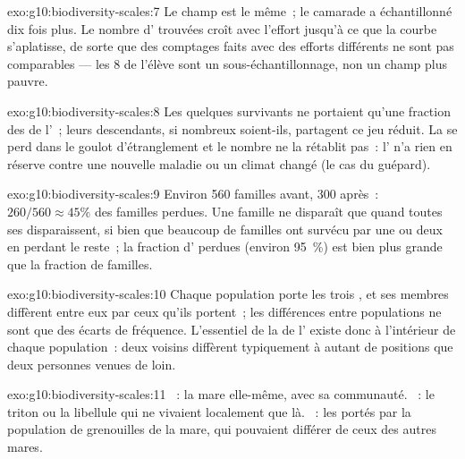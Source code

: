 \begin{solution}{exo:g10:biodiversity-scales:7}
Le champ est le même~; le camarade a échantillonné dix fois plus. Le
nombre d' trouvées croît avec l'effort jusqu'à ce que la courbe
s'aplatisse, de sorte que des comptages faits avec des efforts
différents ne sont pas comparables --- les 8 de l'élève sont un
sous-échantillonnage, non un champ plus pauvre.
\end{solution}

\begin{solution}{exo:g10:biodiversity-scales:8}
Les quelques survivants ne portaient qu'une fraction des  de
l'~; leurs descendants, si nombreux soient-ils, partagent ce jeu
réduit. La  se perd dans le goulot d'étranglement et
le nombre ne la rétablit pas~: l' n'a rien en réserve contre une
nouvelle maladie ou un climat changé (le cas du guépard).
\end{solution}

\begin{solution}{exo:g10:biodiversity-scales:9}
Environ 560 familles avant, 300 après~: $260/560 \approx 45\%$ des
familles perdues. Une famille ne disparaît que quand toutes ses 
disparaissent, si bien que beaucoup de familles ont survécu par une ou
deux  en perdant le reste~; la fraction d' perdues
(environ 95~\%) est bien plus grande que la fraction de familles.
\end{solution}

\begin{solution}{exo:g10:biodiversity-scales:10}
Chaque population porte les trois , et ses membres diffèrent
entre eux par ceux qu'ils portent~; les différences entre populations
ne sont que des écarts de fréquence. L'essentiel de la  de l' existe donc à l'intérieur de chaque population~:
deux voisins diffèrent typiquement à autant de positions que deux
personnes venues de loin.
\end{solution}

\begin{solution}{exo:g10:biodiversity-scales:11}
~: la mare elle-même, avec sa communauté. ~: le triton
ou la libellule qui ne vivaient localement que là. ~: les 
portés par la population de grenouilles de la mare, qui pouvaient
différer de ceux des autres mares.
\end{solution}

